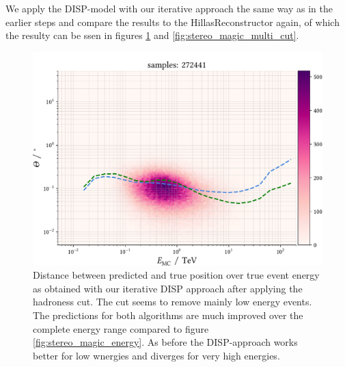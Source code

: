 We apply the DISP-model with our iterative approach
the same way as in the earlier steps and compare the results to the HillasReconstructor
again, of which the resulty can be ssen in figures \ref{fig:stereo_magic_energy_cut}
and \ref{fig:stereo_magic_multi_cut}.

\begin{figure}
    \centering
    \captionsetup{width=0.9\linewidth}
    \includegraphics[width=0.9\linewidth]{../analysis/plots/gamma_cut/pairwise_median_100_vs_energy.pdf} 
    \caption{Distance between predicted and true position over true event energy as obtained with our
    iterative DISP approach after applying the hadroness cut.
    The cut seems to remove mainly low energy events. The predictions for both
    algorithms are much improved over the complete energy range compared to figure \ref{fig:stereo_magic_energy}.
    As before the DISP-approach works better for low wnergies and diverges for very high energies.}
    \label{fig:stereo_magic_energy_cut}
\end{figure}

